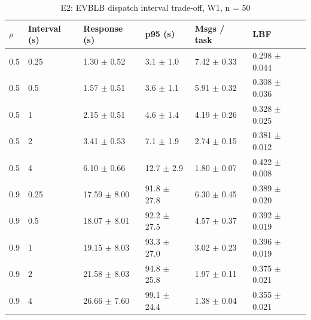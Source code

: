 \begin{table}[t]
\centering
\footnotesize
\caption{E2: EVBLB dispatch interval trade-off, W1, n = 50}
\label{tab:e2}
\begin{tabular}{llllll}
\toprule
$\rho$ & Interval (s) & Response (s) & p95 (s) & Msgs / task & LBF \\
\midrule
0.5 & 0.25 & 1.30 $\pm$ 0.52 & 3.1 $\pm$ 1.0 & 7.42 $\pm$ 0.33 & 0.298 $\pm$ 0.044 \\
0.5 & 0.5 & 1.57 $\pm$ 0.51 & 3.6 $\pm$ 1.1 & 5.91 $\pm$ 0.32 & 0.308 $\pm$ 0.036 \\
0.5 & 1 & 2.15 $\pm$ 0.51 & 4.6 $\pm$ 1.4 & 4.19 $\pm$ 0.26 & 0.328 $\pm$ 0.025 \\
0.5 & 2 & 3.41 $\pm$ 0.53 & 7.1 $\pm$ 1.9 & 2.74 $\pm$ 0.15 & 0.381 $\pm$ 0.012 \\
0.5 & 4 & 6.10 $\pm$ 0.66 & 12.7 $\pm$ 2.9 & 1.80 $\pm$ 0.07 & 0.422 $\pm$ 0.008 \\
0.9 & 0.25 & 17.59 $\pm$ 8.00 & 91.8 $\pm$ 27.8 & 6.30 $\pm$ 0.45 & 0.389 $\pm$ 0.020 \\
0.9 & 0.5 & 18.07 $\pm$ 8.01 & 92.2 $\pm$ 27.5 & 4.57 $\pm$ 0.37 & 0.392 $\pm$ 0.019 \\
0.9 & 1 & 19.15 $\pm$ 8.03 & 93.3 $\pm$ 27.0 & 3.02 $\pm$ 0.23 & 0.396 $\pm$ 0.019 \\
0.9 & 2 & 21.58 $\pm$ 8.03 & 94.8 $\pm$ 25.8 & 1.97 $\pm$ 0.11 & 0.375 $\pm$ 0.021 \\
0.9 & 4 & 26.66 $\pm$ 7.60 & 99.1 $\pm$ 24.4 & 1.38 $\pm$ 0.04 & 0.355 $\pm$ 0.021 \\
\bottomrule
\end{tabular}
\end{table}
